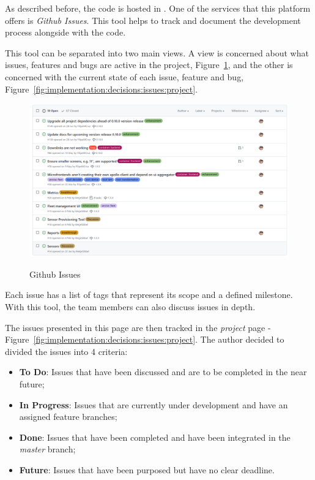 As described before, the code is hosted in . One of the services that this platform offers is \textit{Github Issues}. This tool helps to track and document the development process alongside with the code.

This tool can be separated into two main views. A view is concerned about what issues, features and bugs are active in the project, Figure~\ref{fig:implementation:decisions:issues:board}, and the other is concerned with the current state of each issue, feature and bug, Figure~\ref{fig:implementation:decisions:issues:project}.

\begin{figure}[H]
    \centering
    \resizebox{\columnwidth}{!}
    {
       \includegraphics{assets/figures/github-2.png}
    }
    \caption[Github Issues]{Github Issues}
    \label{fig:implementation:decisions:issues:board}
\end{figure}

Each issue has a list of tags that represent its scope and a defined milestone. With this tool, the team members can also discuss issues in depth. 

The issues presented in this page are then tracked in the \textit{project} page - Figure~\ref{fig:implementation:decisions:issues:project}. The author decided to divided the issues into 4 criteria:

\begin{itemize}
    \item \textbf{To Do}: Issues that have been discussed and are to be completed in the near future; 
    \item \textbf{In Progress}: Issues that are currently under development and have an assigned feature branches;
    \item \textbf{Done}: Issues that have been completed and have been integrated in the \textit{master} branch; 
    \item \textbf{Future}: Issues that have been purposed but have no clear deadline.
\end{itemize}

